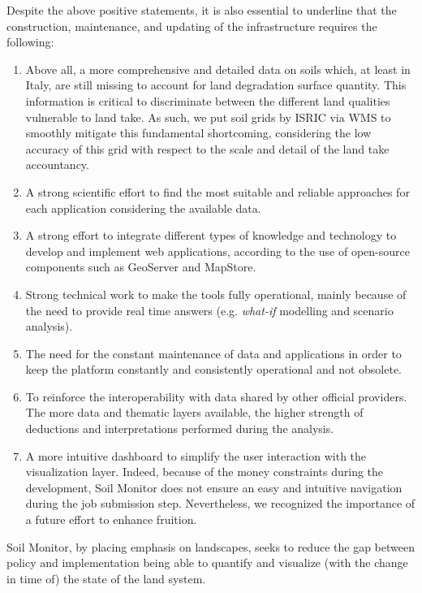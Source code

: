 \documentclass[APA,LATO1COL,doublespace]{WileyNJD-v2}
\begin{document}
Despite the above positive statements, it is also essential to underline that the construction, maintenance, and updating of the infrastructure requires the following:
\begin{enumerate}[label=(\roman*)]
    \item Above all, a more comprehensive and detailed data on soils which, at least in Italy, are still missing to account for land degradation surface quantity. 
    This information is critical to discriminate between the different land qualities vulnerable to land take. 
    As such, we put soil grids by ISRIC via WMS to smoothly mitigate this fundamental shortcoming, considering the low accuracy of this grid with respect to the scale and detail of the land take accountancy.
    \item A strong scientific effort to find the most suitable and reliable approaches for each application considering the available data.
    \item A strong effort to integrate different types of knowledge and technology to develop and implement web applications, according to the use of open-source components such as GeoServer and MapStore.
    \item Strong technical work to make the tools fully operational, mainly because of the need to provide real time answers (e.g. \textit{what-if} modelling and scenario analysis).
    \item The need for the constant maintenance of data and applications in order to keep the platform constantly and consistently operational and not obsolete.
    \item To reinforce the interoperability with data shared by other official providers. 
    The more data and thematic layers available, the higher strength of deductions and interpretations performed during the analysis.
    \item A more intuitive dashboard to simplify the user interaction with the visualization layer.
    Indeed, because of the money constraints during the development, Soil Monitor does not ensure an easy and intuitive navigation during the job submission step. 
    Nevertheless, we recognized the importance of a future effort to enhance fruition.
\end{enumerate}

Soil Monitor, by placing emphasis on landscapes, seeks to reduce the gap between policy and implementation being able to quantify and visualize (with the change in time of) the state of the land system.
\end{document}
